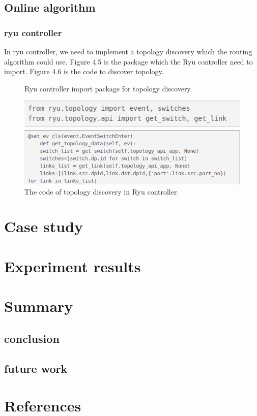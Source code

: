 \documentclass[a4paper,12pt]{report}
\begin{document}
\begin{large}
 	\section{Online algorithm}
 		\subsection{ryu controller}
 		\qquad In ryu controller, we need to implement a topology discovery which the routing algorithm could use. Figure 4.5 is the package which the Ryu controller need to import. Figure 4.6 is the code to discover topology.
 		\begin{figure}
          \caption{Ryu controller import package for topology discovery.}
          \centering
            \includegraphics[width=1.0\textwidth]{ryu_import.png}
          \caption{The code of topology discovery in Ryu controller.}
            \includegraphics[width=1.0\textwidth]{ryu_discovery.png}
      	\end{figure}
  \chapter{Case study}
  \chapter{Experiment results}
  \chapter{Summary}
    \section{conclusion}
    \section{future work}
  \chapter{References}
     \end{large}
    
\end{document}
